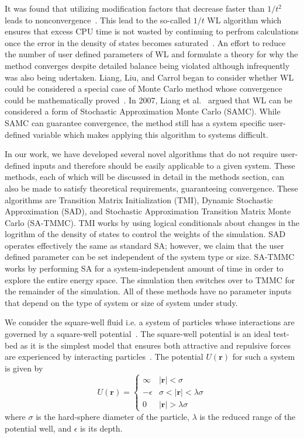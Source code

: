 \documentclass[letterpaper,twocolumn,amsmath,amssymb,pre,aps,10pt]{revtex4-1}
\begin{document}
It was found that utilizing modification factors that decrease faster
than $1/t^2$ leads to nonconvergence~\cite{belardinelli2007fast}.  This
lead to the so-called $1/t$ WL algorithm which ensures that excess CPU
time is not wasted by continuing to perfrom calculations once the error
in the density of states becomes
saturated~\cite{belardinelli2008analysis}. An effort to reduce the
number of user defined parameters of WL and formulate a theory for why
the method converges despite detailed balance being violated although
infrequently was also being udertaken.  Liang, Liu, and Carrol began to
consider whether WL could be considered a special case of Monte Carlo
method whose convergence could be mathematically
proved~\cite{liang2006theory, liang2007stochastic}. In 2007, Liang et
al.~\cite{liang2007stochastic} argued that WL can be considered a form
of Stochastic Approximation Monte Carlo (SAMC).  While SAMC can
guarantee convergence, the method still has a system specific
user-defined variable which makes applying this algorithm to systems
difficult.

In our work, we have developed several novel algorithms that do not
require user-defined inputs and therefore should be easily applicable
to a given system.  These methods, each of which will be discussed in
detail in the methods section, can also be made to satisfy theoretical
requirements, guaranteeing convergence. These algorithms are Transition
Matrix Initialization (TMI), Dynamic Stochastic Approximation (SAD),
and Stochastic Approximation Transition Matrix Monte Carlo (SA-TMMC).
TMI works by using logical conditionals about changes in the logrithm
of the density of states to control the weights of the simulation.  SAD
operates effectively the same as standard SA; however, we claim that
the user defined parameter can be set independent of the system type or
size.  SA-TMMC works by performing SA for a system-independent amount
of time in order to explore the entire energy space.  The simulation
then switches over to TMMC for the remainder of the simulation.  All of
these methods have no parameter inputs that depend on the type of
system or size of system under study.

We consider the square-well fluid i.e. a system of particles whose
interactions are governed by a square-well
potential~\cite{singh2003surface, barker2004perturbationSW}.  The
square-well potential is an ideal test-bed as it is the simplest model
that ensures both attractive and repulsive forces are experienced by
interacting particles~\cite{barker1967-SW-perturbation, vega1992phase}.
The potential $U(\textbf{r})$ for such a system is given by
\begin{equation}
 U(\textbf{r})=\begin{cases} \infty &
 \lvert\textbf{r}\rvert< \sigma\\-\epsilon &
 \sigma<\lvert\textbf{r}\rvert<\lambda\sigma\\0 &
 \lvert\textbf{r}\rvert > \lambda\sigma\end{cases}
\end{equation}
where $\sigma$ is the hard-sphere diameter of the particle, $\lambda$ is the
reduced range of the potential well, and $\epsilon$ is its depth.
\end{document}
